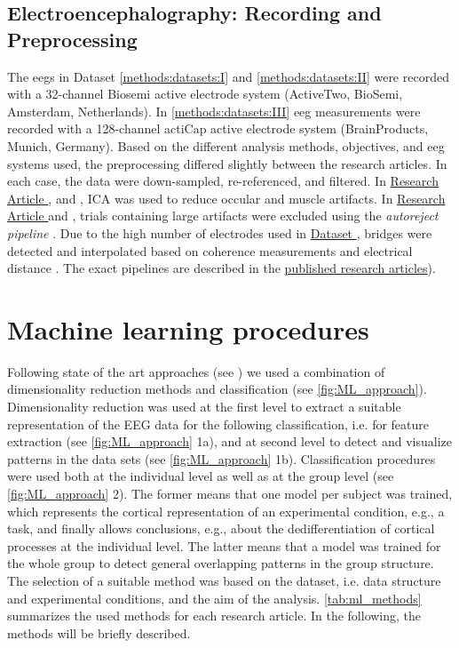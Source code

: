 \subsection{Electroencephalography: Recording and Preprocessing}
The \glspl{eeg} in Dataset \autoref{methods:datasets:I} and \autoref{methods:datasets:II} were recorded with a 32-channel Biosemi active electrode system (ActiveTwo, BioSemi, Amsterdam, Netherlands). In \autoref{methods:datasets:III} \gls{eeg} measurements were recorded with a 128-channel actiCap active electrode system (BrainProducts, Munich, Germany).
Based on the different analysis methods, objectives, and \gls{eeg} systems used, the preprocessing differed slightly between the research articles. In each case, the data were down-sampled, re-referenced, and filtered. In \hyperref[res:paperI]{Research Article }, \hyperref[res:paperIII]{} and \hyperref[res:paperIV]{}, ICA was used to reduce occular and muscle artifacts. In \hyperref[res:paperI]{Research Article } and \hyperref[res:paperIV]{}, trials containing large artifacts were excluded using the \textit{autoreject pipeline} \cite{Jas2017}. Due to the high number of electrodes used in \hyperref[methods:datasets:III]{Dataset }, bridges were detected and interpolated based on coherence measurements and electrical distance \cite{Alschuler2014}. The exact pipelines are described in the \hyperref[pub:papers]{published research articles}).  

\section{Machine learning procedures} 
Following state of the art approaches (see ) we used a combination of dimensionality reduction methods and classification (see \autoref{fig:ML_approach}). Dimensionality reduction was used at the first level to extract a suitable representation of the EEG data for the following classification, i.e. for feature extraction (see \autoref{fig:ML_approach} 1a), and at second level to detect and visualize patterns in the data sets (see \autoref{fig:ML_approach} 1b). Classification procedures were used both at the individual level as well as at the group level (see \autoref{fig:ML_approach} 2). The former means that one model per subject was trained, which represents the cortical representation of an experimental condition, e.g., a task, and finally allows conclusions, e.g., about the dedifferentiation of cortical processes at the individual level. The latter means that a model was trained for the whole group to detect general overlapping patterns in the group structure. The selection of a suitable method was based on the dataset, i.e. data structure and experimental conditions, and the aim of the analysis. \autoref{tab:ml_methods}  summarizes the used methods for each research article. In the following, the methods will be briefly described.

